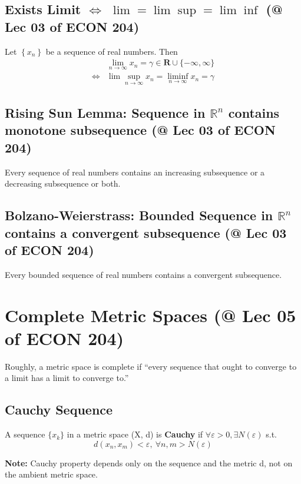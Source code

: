 \documentclass[11pt]{elegantbook}
\begin{document}
\subsection{Exists Limit $\Leftrightarrow$ $\lim=\lim\sup=\lim\inf$ \small{(@ Lec 03 of ECON 204)}}
\begin{theorem}
    Let $\left\{x_n\right\}$ be a sequence of real numbers. Then
    $$
    \begin{aligned}
    & \lim _{n \rightarrow \infty} x_n=\gamma \in \mathbf{R} \cup\{-\infty, \infty\} \\
    \Leftrightarrow & \lim \sup _{n \rightarrow \infty} x_n=\liminf _{n \rightarrow \infty} x_n=\gamma
    \end{aligned}
    $$
\end{theorem}

\subsection{Rising Sun Lemma: Sequence in $\mathbb{R}^n$ contains monotone subsequence \small{(@ Lec 03 of ECON 204)}}
\begin{theorem}
    Every sequence of real numbers contains an increasing subsequence or a decreasing subsequence or both.
\end{theorem}

\subsection{Bolzano-Weierstrass: Bounded Sequence in $\mathbb{R}^n$ contains a convergent subsequence \small{(@ Lec 03 of ECON 204)}}\label{B-W}
\begin{theorem}
    Every bounded sequence of real numbers contains a convergent subsequence.
\end{theorem}



\section{Complete Metric Spaces \small{(@ Lec 05 of ECON 204)}}
Roughly, a metric space is complete if “every sequence that ought to converge to a limit has a limit to converge to.”
\subsection{Cauchy Sequence}
\begin{definition}
    A sequence $\{x_k\}$ in a metric space (X, d) is \textbf{Cauchy} if $\forall \varepsilon>0, \exists N(\varepsilon)$ s.t.
    $$d(x_{n},x_{m})<\varepsilon,\  \forall n, m > N(\varepsilon)$$
\end{definition}
\textbf{Note:} Cauchy property depends only on the sequence and the metric d, not on the ambient metric space.
\end{document}
